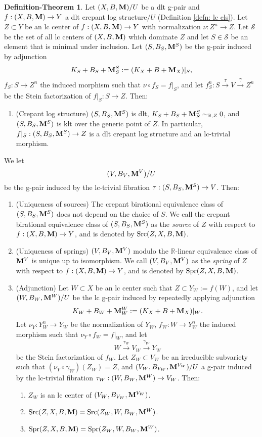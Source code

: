 \documentclass[11pt]{amsart}
\numberwithin{equation}{section}
\newcommand{\Mm}{{\bf{M}}}
\newcommand{\Rr}{\mathbb{R}}
\newcommand{\Src}{{\operatorname{Src}}}
\newcommand{\Spr}{{\operatorname{Spr}}}
\theoremstyle{definition}
\theoremstyle{definition}
\newtheorem{defthm}[thm]{Definition-Theorem}
\theoremstyle{definition}
\begin{document}
\begin{defthm}\label{thm: spring and source for glc crepant log structure}
Let $(X,B,\Mm)/U$ be a dlt g-pair and $f: (X,B,\Mm)\rightarrow Y$ a dlt crepant log structure$/U$ (Definition \ref{defn: lc cls}). Let $Z\subset Y$ be an lc center of $f: (X,B,\Mm)\rightarrow Y$ with normalization $\nu: Z^n\rightarrow Z$. Let $\mathcal{S}$ be the set of all lc centers of $(X,B,\Mm)$ which dominate $Z$ and let $S\in\mathcal{S}$ be an element that is minimal under inclusion. Let $(S,B_S,\Mm^S)$ be the g-pair induced by adjunction
$$K_S+B_S+\Mm^S_S:=(K_X+B+\Mm_X)|_S,$$
$f_S: S\rightarrow Z^n$ the induced morphism such that $\nu\circ f_S=f|_S$, and let $f^n_S: S\xrightarrow{\tau} V\xrightarrow{\gamma} Z^n$ be the Stein factorization of $f|_S: S\rightarrow Z$.
Then:
\begin{enumerate}
\item[(1)] (Crepant log structure) $(S,B_S,\Mm^S)$ is dlt, $K_S+B_S+\Mm^S_S\sim_{\Rr,Z}0$, and $(S,B_S,\Mm^S)$ is klt over the generic point of $Z$. In particular, $f|_S: (S,B_S,\Mm^S)\rightarrow Z$ is a dlt crepant log structure and an lc-trivial morphism.
\end{enumerate}
We let
$$(V,B_{V},\Mm^V)/U$$
be the g-pair induced by the lc-trivial fibration $\tau: (S,B_S,\Mm^S)\rightarrow V$. Then: 
\begin{enumerate}
    \item[(2)] (Uniqueness of sources) The crepant birational equivalence class of $(S,B_S,\Mm^S)$ does not depend on the choice of $S$. We call the crepant birational equivalence class of $(S,B_S,\Mm^S)$ as the \emph{source} of $Z$ with respect to $f: (X,B,\Mm)\rightarrow Y$, and is denoted by $\Src(Z,X,B,\Mm)$.
    \item[(3)] (Uniqueness of springs) $(V,B_V,\Mm^V)$ modulo the $\Rr$-linear equivalence class of $\Mm^V$ is unique up to isomorphism. We call $(V,B_V,\Mm^V)$ as the \emph{spring} of $Z$ with respect to $f: (X,B,\Mm)\rightarrow Y$, and is denoted by $\Spr(Z,X,B,\Mm)$.
    \item[(4)] (Adjunction) Let $W\subset X$ be an lc center such that $Z\subset Y_W:=f(W)$, and let $(W,B_W,\Mm^W)/U$ be the lc g-pair induced by repeatedly applying adjunction
    $$K_W+B_W+\Mm^W_W:=(K_X+B+\Mm_X)|_W.$$  
    Let $\nu_Y: Y_W^n\rightarrow Y_W$ be the normalization of $Y_W$, $f_W: W\rightarrow Y_W^n$ the induced morphism such that $\nu_Y\circ f_W=f|_W$, and let
    $$W\xrightarrow{\tau_W} V_W\xrightarrow{\gamma_W}Y_W$$
    be the Stein factorization of $f_W$. Let $Z_W\subset V_W$ be an irreducible subvariety such that $(\nu_Y\circ\gamma_W)(Z_W)=Z$, and $(V_W,B_{V_W},\Mm^{V_W})/U$ a g-pair induced by the lc-trivial fibration $\tau_W: (W,B_W,\Mm^W)\rightarrow V_W$. Then:
    \begin{enumerate}
    \item $Z_W$ is an lc center of $(V_W,B_{V_W},\Mm^{V_W})$.
    \item $\Src(Z,X,B,\Mm)=\Src(Z_W,W,B_W,\Mm^W)$.
    \item $\Spr(Z,X,B,\Mm)=\Spr(Z_W,W,B_W,\Mm^W)$.
    \end{enumerate}
\end{enumerate}
\end{defthm}
\end{document}
